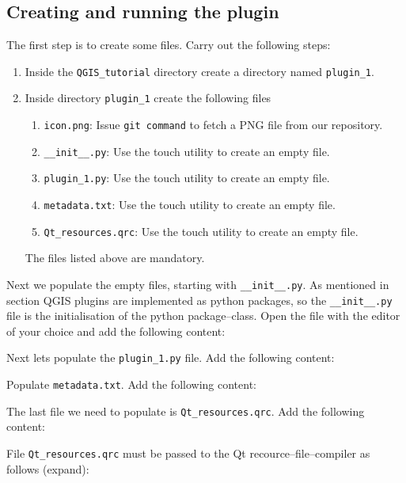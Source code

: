 \subsection{Creating and running the plugin}
\label{ssect:creating_plugin_1}
\par %
The first step is to create some files. Carry out the following steps:
\begin{enumerate}
  \item Inside the \lstinline{QGIS_tutorial} directory create a directory named \lstinline{plugin_1}.
  \item Inside directory \lstinline{plugin_1} create the following files
  \begin{enumerate}
    \item \lstinline{icon.png}: Issue \lstinline{git command} to fetch a PNG file from our repository.
    \item \lstinline{__init__.py}: Use the touch utility to create an empty file.
    \item \lstinline{plugin_1.py}: Use the touch utility to create an empty file.
    \item \lstinline{metadata.txt}: Use the touch utility to create an empty file.
    \item \lstinline{Qt_resources.qrc}: Use the touch utility to create an empty file.
  \end{enumerate}
  The files listed above are mandatory.
\end{enumerate}
Next we populate the empty files, starting with \lstinline{__init__.py}. As mentioned in section \label{sect:introduction} QGIS plugins are implemented as python packages, so the \lstinline{__init__.py} file is the initialisation of the python package--class. Open the file with the editor of your choice and add the following content:

\par%
Next lets populate the \lstinline{plugin_1.py} file. Add the following content:

\par%
Populate \lstinline{metadata.txt}. Add the following content:

\par%
The last file we need to populate is \lstinline{Qt_resources.qrc}. Add the following content:

File \lstinline{Qt_resources.qrc} must be passed to the Qt recource--file--compiler as follows (expand):
